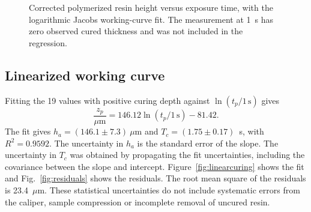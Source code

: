 \documentclass[10pt]{article}
\begin{document}
\begin{figure}[h]
\centering
{}
\caption{Corrected polymerized resin height versus exposure time, with the logarithmic Jacobs working-curve fit. The measurement at 1~s has zero observed cured thickness and was not included in the regression.}
\label{fig:rawcuring}
\end{figure}

\subsection{Linearized working curve}
Fitting the 19 values with positive curing depth against $\ln(t_p/1\,\mathrm{s})$ gives
\begin{equation}
\frac{z_p}{\mu\mathrm{m}}=146.12\ln(t_p/1\,\mathrm{s})-81.42.
\label{eq:fit}
\end{equation}
The fit gives $h_a=(146.1\pm 7.3)~\mu$m and $T_c=(1.75\pm 0.17)$~s, with $R^2=0.9592$. The uncertainty in $h_a$ is the standard error of the slope. The uncertainty in $T_c$ was obtained by propagating the fit uncertainties, including the covariance between the slope and intercept. Figure~\ref{fig:linearcuring} shows the fit and Fig.~\ref{fig:residuals} shows the residuals. The root mean square of the residuals is 23.4~$\mu$m. These statistical uncertainties do not include systematic errors from the caliper, sample compression or incomplete removal of uncured resin.
\end{document}
